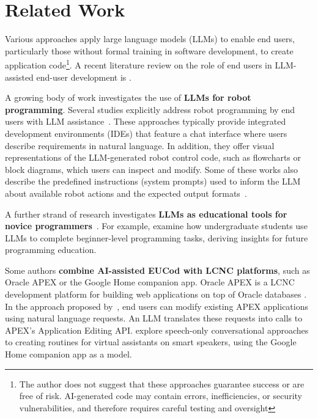 \documentclass[english,anonymous]{lni}
\begin{document}
\section{Related Work}\label{sec:related}

Various approaches apply large language models (LLMs) to enable end users, particularly those without formal training in software development, to create application code\footnote{The author does not suggest that these approaches guarantee success or are free of risk. AI-generated code may contain errors, inefficiencies, or security vulnerabilities, and therefore requires careful testing and oversight}. A recent literature review on the role of end users in LLM-assisted end-user development is \cite{gargioniExploringRoleEnd2024}.

A growing body of work investigates the use of \textbf{LLMs for robot programming}. Several studies explicitly address robot programming by end users with LLM assistance~\cite{ge2024cocobo, karliAlchemistLLMAidedEndUser2024, bimbattiCanChatGPTSupport2023, gargioniPreparationPersonalizedMedicines2025}. These approaches typically provide integrated development environments (IDEs) that feature a chat interface where users describe requirements in natural language. In addition, they offer visual representations of the LLM-generated robot control code, such as flowcharts or block diagrams, which users can inspect and modify.
Some of these works also describe the predefined instructions (system prompts) used to inform the LLM about available robot actions and the expected output formats~\cite{ge2024cocobo, karliAlchemistLLMAidedEndUser2024, gargioniPreparationPersonalizedMedicines2025}.


A further strand of research investigates \textbf{LLMs as educational tools for novice programmers}~\cite{feldmanNonExpertProgrammersGenerative2024, pratherWideningGapBenefits2024, nguyenHowBeginningProgrammers2024, chenLearningAgentbasedModeling2024}. For example, \textcite{feldmanNonExpertProgrammersGenerative2024} examine how undergraduate students use LLMs to complete beginner-level programming tasks, deriving insights for future  programming education.

Some authors \textbf{combine AI-assisted  EUCod with LCNC platforms}, such as 
Oracle APEX \cite{gorissenEndUserDevelopmentOracle2024}  or the Google Home companion app. Oracle APEX is a LCNC development platform for building web applications on top of Oracle databases \cite{oracleOracleAPEX}. 
In the approach proposed by~\cite{gorissenEndUserDevelopmentOracle2024}, end users can modify existing APEX applications using natural language requests. An LLM translates these requests into calls to APEX’s Application Editing API.
\textcite{barricelliPosterNaturalLanguage2023} explore speech-only conversational approaches to creating routines for virtual assistants on smart speakers, using the Google Home companion app as a model.
\end{document}
